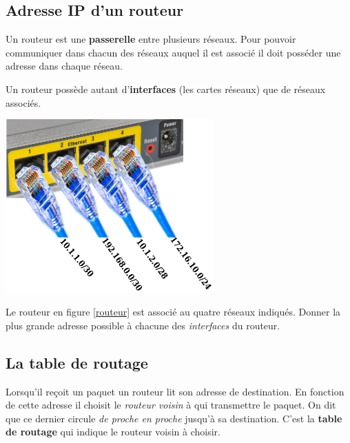 \documentclass[a4paper,11pt]{article}
\begin{document}
\subsection{Adresse IP d'un routeur}
Un routeur est une \textbf{passerelle} entre plusieurs réseaux. Pour pouvoir communiquer dans chacun des réseaux auquel il est associé il doit posséder une adresse dans chaque réseau. 
\begin{aretenir}[]
    Un routeur possède autant d'\textbf{interfaces} (les cartes réseaux) que de réseaux associés.
\end{aretenir}
\begin{center}
    \centering
    \includegraphics[width=8cm]{ressources/routeur-adresses.png}
    \label{routeur}
\end{center}
\begin{activite}
Le routeur en figure \ref{routeur} est associé au quatre réseaux indiqués. Donner la plus grande adresse possible à chacune des \emph{interfaces} du routeur.
\end{activite}
\subsection{La table de routage}
Lorsqu'il reçoit un paquet un routeur lit son adresse de destination. En fonction de cette adresse il choisit le \emph{routeur voisin} à qui transmettre le paquet. On dit que ce dernier circule \emph{de proche en proche} jusqu'à sa destination. C'est la \textbf{table de routage} qui indique le routeur voisin à choisir.
\end{document}

